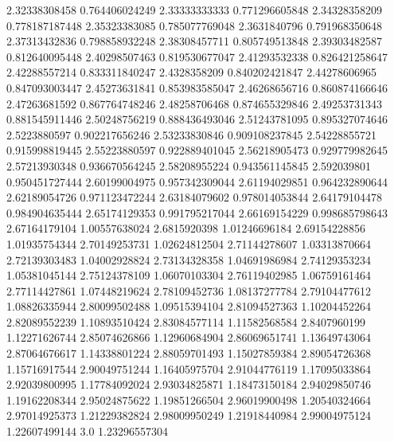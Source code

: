   2.32338308458   0.764406024249
  2.33333333333   0.771296605848
  2.34328358209   0.778187187448
  2.35323383085   0.785077769048
   2.3631840796   0.791968350648
  2.37313432836   0.798858932248
  2.38308457711   0.805749513848
  2.39303482587   0.812640095448
  2.40298507463   0.819530677047
  2.41293532338   0.826421258647
  2.42288557214   0.833311840247
   2.4328358209   0.840202421847
  2.44278606965   0.847093003447
  2.45273631841   0.853983585047
  2.46268656716   0.860874166646
  2.47263681592   0.867764748246
  2.48258706468   0.874655329846
  2.49253731343   0.881545911446
  2.50248756219   0.888436493046
  2.51243781095   0.895327074646
   2.5223880597   0.902217656246
  2.53233830846   0.909108237845
  2.54228855721   0.915998819445
  2.55223880597   0.922889401045
  2.56218905473   0.929779982645
  2.57213930348   0.936670564245
  2.58208955224   0.943561145845
    2.592039801   0.950451727444
  2.60199004975   0.957342309044
  2.61194029851   0.964232890644
  2.62189054726   0.971123472244
  2.63184079602   0.978014053844
  2.64179104478   0.984904635444
  2.65174129353   0.991795217044
  2.66169154229   0.998685798643
  2.67164179104    1.00557638024
   2.6815920398    1.01246696184
  2.69154228856    1.01935754344
  2.70149253731    1.02624812504
  2.71144278607    1.03313870664
  2.72139303483    1.04002928824
  2.73134328358    1.04691986984
  2.74129353234    1.05381045144
  2.75124378109    1.06070103304
  2.76119402985    1.06759161464
  2.77114427861    1.07448219624
  2.78109452736    1.08137277784
  2.79104477612    1.08826335944
  2.80099502488    1.09515394104
  2.81094527363    1.10204452264
  2.82089552239    1.10893510424
  2.83084577114    1.11582568584
   2.8407960199    1.12271626744
  2.85074626866    1.12960684904
  2.86069651741    1.13649743064
  2.87064676617    1.14338801224
  2.88059701493    1.15027859384
  2.89054726368    1.15716917544
  2.90049751244    1.16405975704
  2.91044776119    1.17095033864
  2.92039800995    1.17784092024
  2.93034825871    1.18473150184
  2.94029850746    1.19162208344
  2.95024875622    1.19851266504
  2.96019900498    1.20540324664
  2.97014925373    1.21229382824
  2.98009950249    1.21918440984
  2.99004975124    1.22607499144
            3.0    1.23296557304
